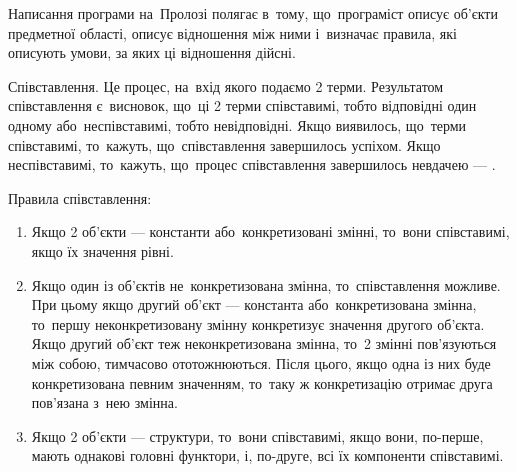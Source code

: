 \documentclass[
	a4paper,
	oneside,
	BCOR = 10mm,
	DIV = 12,
	12pt,
	headings = normal,
]{scrartcl}
\begin{document}
		Написання програми на~Пролозі полягає в~тому, що~програміст описує об'єкти предметної області, описує відношення між ними і~визначає правила, які описують умови, за яких ці відношення дійсні. 

		Співставлення. Це процес, на~вхід якого подаємо 2 терми. Результатом співставлення є~висновок, що~ці 2 терми співставимі, тобто відповідні один одному або~неспівставимі, тобто невідповідні. Якщо виявилось, що~терми співставимі, то~кажуть, що~співставлення завершилось успіхом. Якщо неспівставимі, то~кажуть, що~процес співставлення завершилось невдачею — . 

		Правила співставлення: 
		\begin{enumerate}
			\item Якщо 2 об'єкти — константи або~конкретизовані змінні, то~вони співставимі, якщо їх значення рівні. 
			\item Якщо один із об'єктів не~конкретизована змінна, то~співставлення можливе. При цьому якщо другий об'єкт — константа або~конкретизована змінна, то~першу неконкретизовану змінну конкретизує значення другого об'єкта. Якщо другий об'єкт теж неконкретизована змінна, то~2 змінні пов'язуються між собою, тимчасово ототожнюються. Після цього, якщо одна із них буде конкретизована певним значенням, то~таку ж конкретизацію отримає друга пов'язана з~нею змінна. 
			\item Якщо 2 об'єкти — структури, то~вони співставимі, якщо вони, по-перше, мають однакові головні функтори, і, по-друге, всі їх компоненти співставимі. 
		\end{enumerate}
\end{document}
